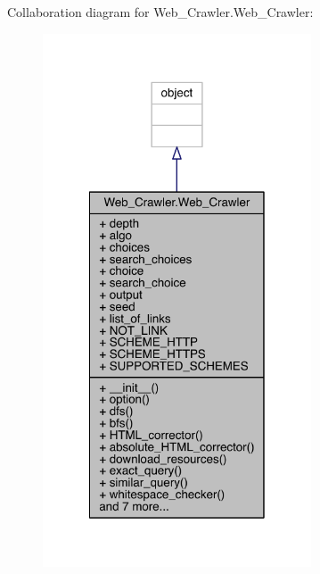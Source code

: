 Collaboration diagram for Web\+\_\+\+Crawler.\+Web\+\_\+\+Crawler\+:
\nopagebreak
\begin{figure}[H]
\begin{center}
\leavevmode
\includegraphics[width=226pt]{class_web___crawler_1_1_web___crawler__coll__graph}
\end{center}
\end{figure}
